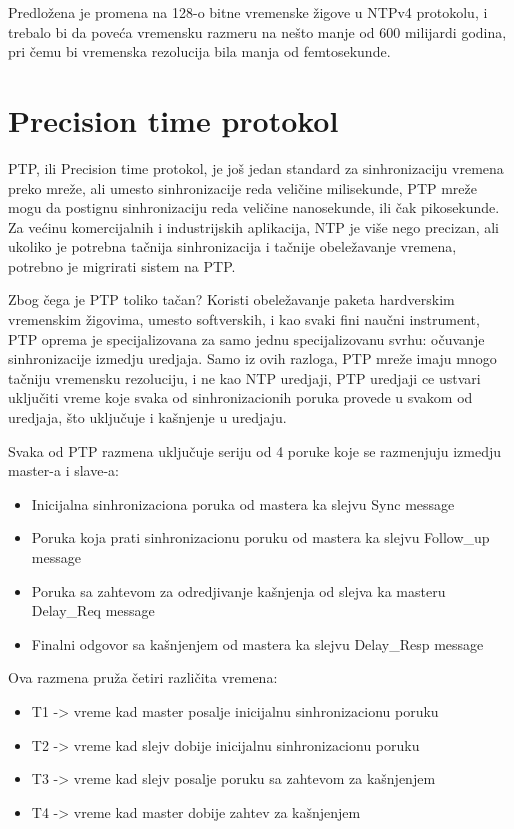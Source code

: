 \documentclass[a4paper,12pt, master]{etf}
\begin{document}
	Predlo\v{z}ena je promena na 128-o bitne vremenske \v{z}igove u NTPv4 protokolu, i trebalo bi da
	pove\'{c}a vremensku razmeru na ne\v{s}to manje od 600 milijardi godina, pri \v{c}emu bi vremenska
	rezolucija bila manja od femtosekunde.

	\section{Precision time protokol}

	PTP, ili Precision time protokol, je jo\v{s} jedan standard za sinhronizaciju vremena preko
	mre\v{z}e, ali umesto sinhronizacije reda veli\v{c}ine milisekunde, PTP mre\v{z}e mogu da postignu
	sinhronizaciju reda veli\v{c}ine nanosekunde, ili \v{c}ak pikosekunde. Za ve\'{c}inu komercijalnih i
	industrijskih aplikacija, NTP je vi\v{s}e nego precizan, ali ukoliko je potrebna ta\v{c}nija
	sinhronizacija i ta\v{c}nije obele\v{z}avanje vremena, potrebno je migrirati sistem na PTP.

	Zbog \v{c}ega je PTP toliko ta\v{c}an? Koristi obele\v{z}avanje paketa hardverskim vremenskim
	\v{z}igovima, umesto softverskih, i kao svaki fini nau\v{c}ni instrument, PTP oprema je
	specijalizovana za samo jednu specijalizovanu svrhu: o\v{c}uvanje sinhronizacije izmedju
	uredjaja. Samo iz ovih razloga, PTP mre\v{z}e imaju mnogo ta\v{c}niju vremensku rezoluciju, i ne
	kao NTP uredjaji, PTP uredjaji ce ustvari uklju\v{c}iti vreme koje svaka od sinhronizacionih
	poruka provede u svakom od uredjaja, \v{s}to uklju\v{c}uje i ka\v{s}njenje u uredjaju.

	Svaka od PTP razmena uklju\v{c}uje seriju od 4 poruke koje se razmenjuju izmedju master-a i
	slave-a:
	\begin{itemize}
		\item Inicijalna sinhronizaciona poruka od mastera ka slejvu {Sync message}
		\item Poruka koja prati sinhronizacionu poruku od mastera ka slejvu {Follow\_up message}
		\item Poruka sa zahtevom za odredjivanje ka\v{s}njenja od slejva ka masteru {Delay\_Req
		message}
		\item Finalni odgovor sa ka\v{s}njenjem od mastera ka slejvu {Delay\_Resp message}
        \end{itemize}

	Ova razmena pru\v{z}a \v{c}etiri razli\v{c}ita vremena:
	\begin{itemize}
		\item T1 -> vreme kad master posalje inicijalnu sinhronizacionu poruku
		\item T2 -> vreme kad slejv dobije inicijalnu sinhronizacionu poruku
		\item T3 -> vreme kad slejv posalje poruku sa zahtevom za ka\v{s}njenjem
		\item T4 -> vreme kad master dobije zahtev za ka\v{s}njenjem
        \end{itemize}
\end{document}
